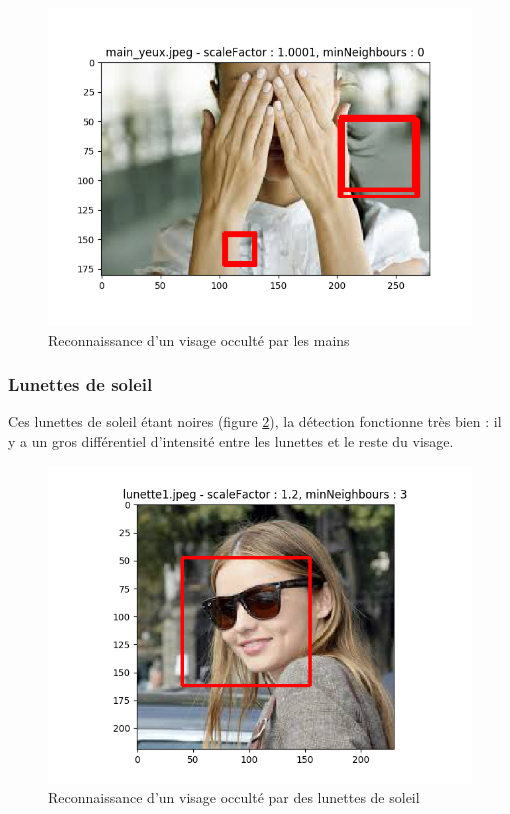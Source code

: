 \documentclass[a4paper,11pt]{article}
\begin{document}
	    \begin{figure}[H]
	        \begin{center}
		   \includegraphics[scale = 0.6]{images/main_yeux_1,0001_0.png}
		   \caption{Reconnaissance d'un visage occulté par les mains}
		   \label{fig:mains}
	        \end{center}
	    \end{figure}

	\subsubsection{Lunettes de soleil}

	    Ces lunettes de soleil étant noires (figure \ref{fig:lunette}), la détection fonctionne très bien : il y a un gros
	    différentiel d'intensité entre les lunettes et le reste du visage.

	    \begin{figure}[H]
	        \begin{center}
		   \includegraphics[scale = 0.6]{images/lunette1_1,2_3.png}
		   \caption{Reconnaissance d'un visage occulté par des lunettes de soleil}
		   \label{fig:lunette}
	        \end{center}
	    \end{figure}
	
\end{document}
